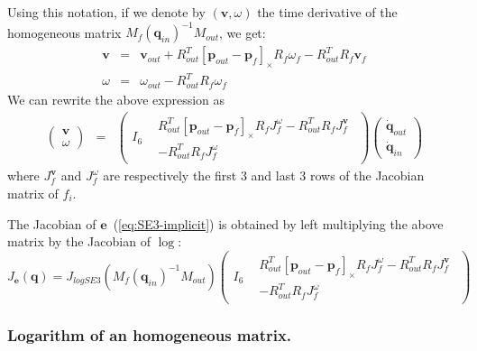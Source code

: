\documentclass {article}
\newcommand\conf{\mathbf{q}}
\begin{document}
Using this notation, if we denote by $(\mathbf{v}, \omega)$ the time derivative of the homogeneous matrix $M_{f}(\conf_{in})^{-1} M_{out}$, we get:
\begin{eqnarray*}
\mathbf{v} &=& \mathbf{v}_{out} + R_{out}^T [\mathbf{p}_{out} - \mathbf{p}_{f}]_{\times} R_{f}\omega_{f} - R_{out}^T R_{f}\mathbf{v}_{f}\\
\omega &=& \omega_{out} - R_{out}^TR_{f} \omega_{f}
\end{eqnarray*}
We can rewrite the above expression as
\begin{eqnarray*}
\left(\begin{array}{c}\mathbf{v}\\\omega\end{array}\right) &=&
\left(\begin{array}{cc}I_6 & \begin{array}{c}R_{out}^T [\mathbf{p}_{out} - \mathbf{p}_{f}]_{\times} R_{f}J_{f}^{\omega} - R_{out}^T R_{f}J_{f}^{\mathbf{v}}\\
-R_{out}^TR_{f} J_{f}^{\omega}\end{array}\end{array}\right)
\left(\begin{array}{c}\dot{\conf}_{out} \\\dot{\conf}_{in}\end{array}\right)
\end{eqnarray*}
where $J_{f}^{\mathbf{v}}$ and $J_{f}^{\omega}$ are respectively the first 3 and last
3 rows of the Jacobian matrix of $f_i$.

The Jacobian of $\mathbf{e}$~(\ref{eq:SE3-implicit}) is obtained by left multiplying the above matrix by the Jacobian of $\log$:
$$
J_{\mathbf{e}} (\conf) = J_{logSE3} (M_{f}(\conf_{in})^{-1} M_{out})
\left(\begin{array}{cc}I_6 & \begin{array}{c}R_{out}^T [\mathbf{p}_{out} - \mathbf{p}_{f}]_{\times} R_{f}J_{f}^{\omega} - R_{out}^T R_{f}J_{f}^{\mathbf{v}}\\
-R_{out}^TR_{f} J_{f}^{\omega}\end{array}\end{array}\right)
$$

\subsubsection {Logarithm of an homogeneous matrix.}
\end{document}
